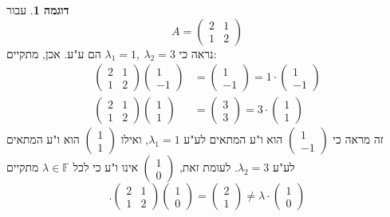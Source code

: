 \documentclass[12pt]{report}
\theoremstyle{plain}
\theoremstyle{definition}
\newtheorem{example}{דוגמה}[chapter]
\newcommand{\F}{\mathbb{F}}
\newcommand{\0}{\mathbf{0}}
\begin{document}
\begin{example}\label{ex:eigenvalues}
עבור
$$
A=\begin{pmatrix}
2 & 1 \\
1 & 2
\end{pmatrix}
$$
נראה כי
$\lambda_1=1,\ \lambda_2=3$
הם ע"ע. אכן, מתקיים:
$$
\begin{aligned}
\begin{pmatrix}
2 & 1 \\
1 & 2
\end{pmatrix}\begin{pmatrix}1\\-1\end{pmatrix}&=\begin{pmatrix}1\\-1\end{pmatrix}=1\cdot\begin{pmatrix}1\\-1\end{pmatrix} \\
\begin{pmatrix}
2 & 1 \\
1 & 2
\end{pmatrix}\begin{pmatrix}1\\1\end{pmatrix}&=\begin{pmatrix}3\\3\end{pmatrix}=3\cdot\begin{pmatrix}1\\1\end{pmatrix}
\end{aligned}
$$
זה מראה כי
$\begin{pmatrix}1\\-1\end{pmatrix}$
הוא ו"ע המתאים לע"ע
$\lambda_1=1$,
ואילו 
$\begin{pmatrix}1\\1\end{pmatrix}$
הוא ו"ע המתאים לע"ע
$\lambda_2=3$.
לעומת זאת, 
$\begin{pmatrix}1\\0\end{pmatrix}$
אינו ו"ע כי לכל
$\lambda\in\F$
מתקיים
$$
.\begin{pmatrix}
2 & 1 \\
1 & 2
\end{pmatrix}\begin{pmatrix}1\\0\end{pmatrix}=\begin{pmatrix}2\\1\end{pmatrix}\neq \lambda\cdot\begin{pmatrix}1\\0\end{pmatrix}
$$


\end{example}
\end{document}
